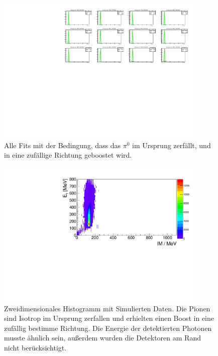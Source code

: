 \documentclass[a4paper,11pt,oneside,final,german,openbib,pdftex]{scrbook}
\begin{document}
{\begin{appendix}
\begin{figure}[h!]
	\begin{center}
		\includegraphics[width=100mm]{NewCalib/UrsprungIsotrop/20171904SimIsotropUrsprungNoCutAllFits}
\caption[Simulation: Isotroper Boost im Ursprung alle Fits]{Alle Fits mit der Bedingung, dass das $\pi^0$ im Ursprung zerf\"allt, und in eine zuf\"allige Richtung geboostet wird. }
\label{fig:All-Fits-Isotrop-No-Cut}
\end{center}

\end{figure}

\begin{figure}[h!]
	\begin{center}
		\includegraphics[width=100mm]{NewCalib/UrsprungIsotrop/20171904SimUrsprungIsotrop30DegreeCutHist}
		\caption[Simulation: 2D-Hist Isotroper Boost im Ursprung ohne Detektoren am Rand]{Zweidimensionales Histogramm mit Simulierten Daten. Die Pionen sind Isotrop im Ursprung zerfallen und erhielten einen Boost in eine zuf\"allig bestimme Richtung. Die Energie der detektierten Photonen musste \"ahnlich sein, au{\ss}erdem wurden die Detektoren am Rand nicht ber\"ucksichtigt.}
		\label{fig:Sim-Data-Ursprung-2DHist-30-Degree-Edge}
	\end{center}
\end{figure}


\end{appendix}}
\end{document}
